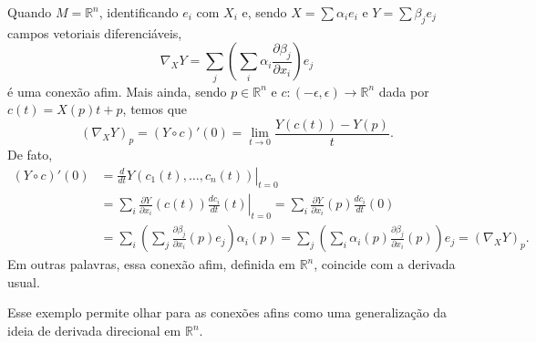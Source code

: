 \begin{example}
	\label{ex:conexao-afim}
	Quando $M=\mathbb{R}^{n}$, identificando $e_{i}$ com $X_{i}$ e, sendo $X = \sum\alpha_{i}e_{i}$ e $Y=\sum\beta_{j}e_{j}$ campos vetoriais diferenciáveis,
	\begin{equation*}
		\nabla_{X}Y=\sum_{j}\left( \sum_{i}\alpha_{i}\frac{\partial\beta_{j}}{\partial x_{i}} \right)e_{j}
	\end{equation*}
	é uma conexão afim. Mais ainda, sendo $p \in \mathbb{R}^{n}$ e $c:(-\epsilon,\epsilon) \to \mathbb{R}^{n}$ dada por $c(t)=X(p)t+p$, temos que
	\begin{equation*}
		(\nabla _{X}Y)_{p}=(Y \circ c)'(0)=\lim_{ t \to 0 } \frac{Y(c(t))-Y(p)}{t}.
	\end{equation*}
	De fato,
	\begin{align*}
		(Y \circ c)'(0) & = \left. \frac{d}{dt} Y(c_1(t), \dots, c_n(t)) \right|_{t=0}                                                                                                                                           \\
		                & = \left. \sum_i \frac{\partial Y}{\partial x_i}(c(t)) \frac{dc_i}{dt}(t) \right|_{t=0}  = \sum_i \frac{\partial Y}{\partial x_i}(p) \frac{dc_i}{dt}(0)                                                 \\
		                & = \sum_i \left( \sum_j \frac{\partial \beta_j}{\partial x_i}(p) e_j \right) \alpha_i(p)  = \sum_j \left( \sum_i \alpha_i(p) \frac{\partial \beta_j}{\partial x_i}(p) \right) e_j  = (\nabla_{X}Y)_{p}.
	\end{align*}
	Em outras palavras, essa conexão afim, definida em $\mathbb{R}^{n}$, coincide com a derivada usual.
\end{example}
Esse exemplo permite olhar para as conexões afins como uma generalização da ideia de derivada direcional em $\mathbb{R}^{n}$.

